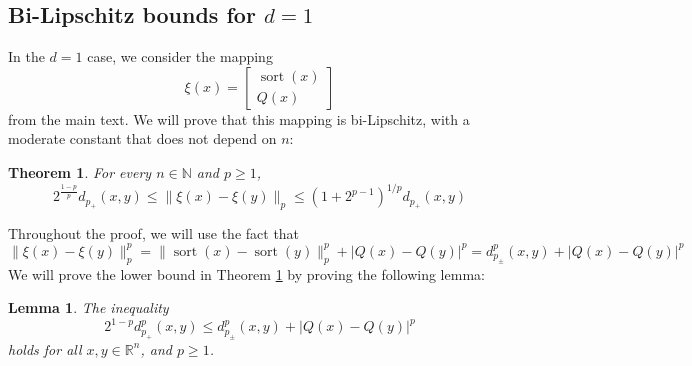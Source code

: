 \documentclass{amsart}
\theoremstyle{plain}
\newtheorem{theorem}{Theorem}
\newtheorem{lemma}{Lemma}
\theoremstyle{definition}
\theoremstyle{remark}
\DeclareMathOperator{\sort}{sort}
\newcommand{\RR}{\mathbb{R}}
\newcommand{\NN}{\mathbb{N}}
\newcommand{\abs}[1]{\left\lvert#1\right\rvert}
\begin{document}
\subsection{Bi-Lipschitz bounds for $d=1$}
In the $d=1$ case, we consider the mapping 
$$\xi(x) = \begin{bmatrix}
\sort{(x)} \\ Q(x)
\end{bmatrix}$$
from the main text. We will prove that this mapping is bi-Lipschitz, with a moderate constant that does not depend on $n$:
\begin{theorem}\label{thm:quantitative}
For every $n\in \NN$ and $p\geq 1$, 
\begin{equation}
   2^{\frac{1-p}{p}} d_{p_{+}}(x, y) \leq \|\xi(x)-\xi(y)\|_p \leq (1+2^{p-1})^{1/p}  d_{p_{+}}(x, y) 
\end{equation}
\end{theorem}
Throughout the proof, we will use the fact that 
\begin{equation}
    \|\xi(x)-\xi(y)\|_p^p=\|\sort(x)-\sort(y)\|_p^p+|Q(x)-Q(y)|^p=d^p_{p_\pm}(x, y) +|Q(x)-Q(y)|^p
\end{equation}
We will prove the lower bound in Theorem \ref{thm:quantitative} by proving the following lemma:
\begin{lemma} \label{lemma:l1}
    The inequality
    \begin{equation}
       2^{1-p}d^p_{p_+}(x, y) \leq d^p_{p_\pm}(x, y) +  \abs{Q(x)- Q(y)}^p 
    \end{equation}
     holds for all $x, y \in \RR^{n}$, and $p \geq 1$.
\end{lemma}
\end{document}
